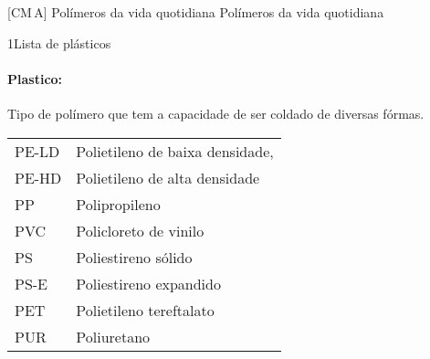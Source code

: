 \documentclass[\mainfilename]{subfiles}
\begin{document}
\graphicspath{{\subfix{./.build/figures/CM_A-Slides_Annotations.2.1}}}

[CM\,A]
{Polímeros da vida quotidiana} %
{Polímeros da vida quotidiana} %

\begin{sectionBox}1{Lista de plásticos} %
    
    \paragraph*{Plastico:} Tipo de polímero que tem a capacidade de ser coldado de diversas fórmas.

    \begin{center}
        \vspace{1ex}
        \begin{tabular}{l l}
            \toprule
            
               PE-LD & Polietileno de baixa densidade, 
            \\ PE-HD & Polietileno de alta densidade
            \\ PP    & Polipropileno 
            \\ PVC   & Policloreto de vinilo 
            \\ PS    & Poliestireno sólido
            \\ PS-E  & Poliestireno expandido 
            \\ PET   & Polietileno tereftalato 
            \\ PUR   & Poliuretano 
            
            \\\bottomrule
        \end{tabular}
        \vspace{2ex}
    \end{center}
    
\end{sectionBox}
\end{document}
